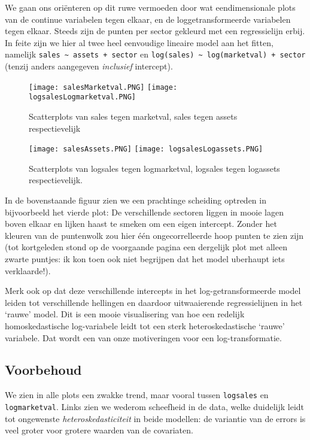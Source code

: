 \documentclass[a4paper]{report}
\begin{document}
  We gaan ons ori\"enteren op dit ruwe vermoeden door wat eendimensionale plots van de continue variabelen tegen elkaar, en de loggetransformeerde variabelen tegen elkaar. Steeds zijn de punten per sector gekleurd met een regressielijn erbij. In feite zijn we hier al twee heel eenvoudige lineaire model aan het fitten, namelijk \verb!sales ~ assets + sector! en \verb!log(sales) ~ log(marketval) + sector! (tenzij anders aangegeven \emph{inclusief} intercept).
  
  \begin{figure}[H]
  \label{2d scatterplots}
  \texttt{[image: salesMarketval.PNG]}
  \texttt{[image: logsalesLogmarketval.PNG]}
  \caption{Scatterplots van sales tegen marketval, sales tegen assets respectievelijk}
  \end{figure}
  \begin{figure}[H]
  \texttt{[image: salesAssets.PNG]}
  \texttt{[image: logsalesLogassets.PNG]}
  \caption{Scatterplots van logsales tegen logmarketval, logsales tegen logassets respectievelijk.}
  \end{figure}
  
  In de bovenstaande figuur zien we een prachtinge scheiding optreden in bijvoorbeeld het vierde plot: De verschillende sectoren liggen in mooie lagen boven elkaar en lijken haast te smeken om een eigen intercept. Zonder het kleuren van de puntenwolk zou hier \' e\' en ongecorrelleerde hoop punten te zien zijn (tot kortgeleden stond op de voorgaande pagina een dergelijk plot met alleen zwarte puntjes: ik kon toen ook niet begrijpen dat het model uberhaupt iets verklaarde!). 
  
  Merk ook op dat deze verschillende intercepts in het log-getransformeerde model leiden tot verschillende hellingen en daardoor uitwaaierende regressielijnen in het `rauwe' model. Dit is een mooie visualisering van hoe een  redelijk homoskedastische log-variabele leidt tot een sterk heteroskedastische  `rauwe' variabele. Dat wordt een van onze motiveringen voor een log-transformatie.
  
\subsection{Voorbehoud} 
  We zien in alle plots een zwakke trend, maar vooral tussen \verb!logsales! en \verb!logmarketval!. Links zien we wederom scheefheid in de data, welke duidelijk leidt tot ongewenste \emph{heteroskedasticiteit} in beide modellen: de variantie van de errors is veel groter voor grotere waarden van de covariaten.
  
\end{document}
